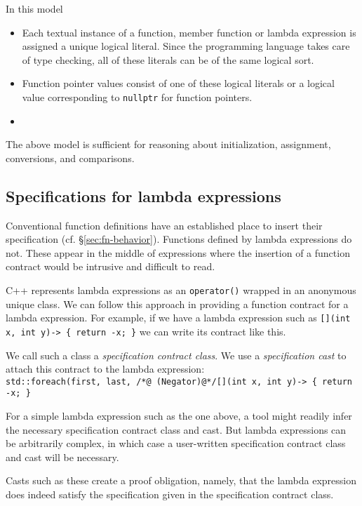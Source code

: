  In this model
 \begin{itemize}
 	\item Each textual instance of a function, member function or lambda expression is assigned a unique logical literal.
 	Since the programming language takes care of type checking,
 	all of these literals can be of the same logical sort.
 	\item Function pointer values consist of one of these logical literals or a logical value corresponding to
 	\lstinline|nullptr| for function pointers.
 	\item {}
 \end{itemize}
The above model is sufficient for reasoning about initialization, assignment, conversions, and comparisons.

\subsection{Specifications for lambda expressions}
\label{sec:lambdaspecs}

Conventional function definitions have an established place to insert their specification (cf. \S\ref{sec:fn-behavior}). Functions defined by lambda expressions do not. These appear in the middle of expressions where the insertion of a function contract would be intrusive and difficult to read.

C++ represents lambda expressions as an \lstinline|operator()| wrapped in an anonymous unique class. We can follow this
approach in providing a function contract for a lambda expression.
For example, if we have a lambda expression such as \lstinline|[](int x, int y)-> { return -x; }| we can write its contract like this.



We call such a class a \emph{specification contract class}.
We use a \emph{specification cast} to attach this contract to
the lambda expression:\\
\lstinline|std::foreach(first, last, /*@ (Negator)@*/[](int x, int y)-> { return -x; }|

For a simple lambda expression such as the one above, a tool might readily infer the necessary specification contract class and cast. But lambda expressions can be arbitrarily complex, in which case a user-written specification contract class and cast will be necessary.

Casts such as these create a proof obligation, namely, that the
lambda expression does indeed satisfy the specification given in the
specification contract class.

